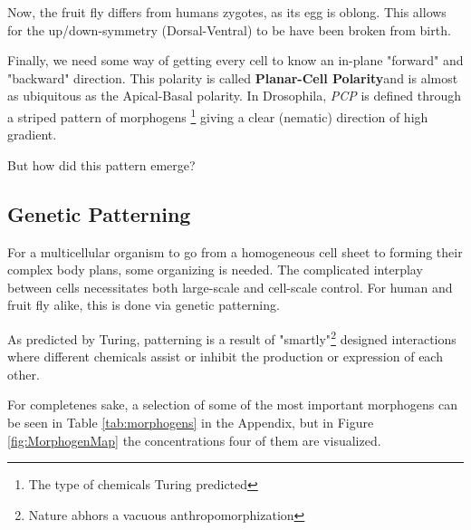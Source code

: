 Now, the fruit fly differs from humans zygotes, as its egg is oblong. This allows for the up/down-symmetry (Dorsal-Ventral) to be have been broken from birth. \reph 

Finally, we need some way of getting every cell to know an in-plane "forward" and "backward" direction. This polarity is called \textbf{Planar-Cell Polarity}and is almost as ubiquitous as the Apical-Basal polarity. In Drosophila, \textit{PCP} is defined through a striped pattern of morphogens \footnote{The type of chemicals Turing predicted} giving a clear (nematic) direction of high gradient.

But how did this pattern emerge? 



\subsection{Genetic Patterning}
\label{sec:gen_patterns}
For a multicellular organism to go from a homogeneous cell sheet to forming their complex body plans, some organizing is needed. The complicated interplay between cells necessitates both large-scale and cell-scale control. For human and fruit fly alike, this is done via genetic patterning.\cite{veraksa2000developmental}

As predicted by Turing, patterning is a result of "smartly"\footnote{Nature abhors a vacuous anthropomorphization} designed interactions where different chemicals assist or inhibit the production or expression of each other. 


For completenes sake, a selection of some of the most important morphogens can be seen in Table \ref{tab:morphogens} in the Appendix, but in Figure \ref{fig:MorphogenMap} the concentrations four of them are visualized.


\noindent

